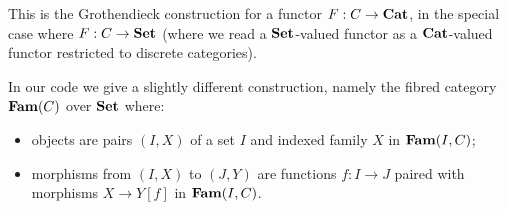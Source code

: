 \documentclass{acmart}
\begin{document}
\noindent This is the Grothendieck construction for a functor $F: C \to \mathbf{Cat}$, in the special case where $F: C
\to \mathbf{Set}$ (where we read a $\mathbf{Set}$-valued functor as a $\mathbf{Cat}$-valued functor restricted to discrete
categories).

In our code we give a slightly different construction, namely the fibred category $\mathbf{Fam}(C)$ over $\mathbf{Set}$ where:
\begin{itemize}
\item objects are pairs $(I, X)$ of a set $I$ and indexed family $X$ in $\mathbf{Fam}(I,C)$;
\item morphisms from $(I, X)$ to $(J, Y)$ are functions $f: I \to J$ paired with morphisms $X \to Y[f]$ in
$\mathbf{Fam}(I,C)$.
\end{itemize}
\end{document}
